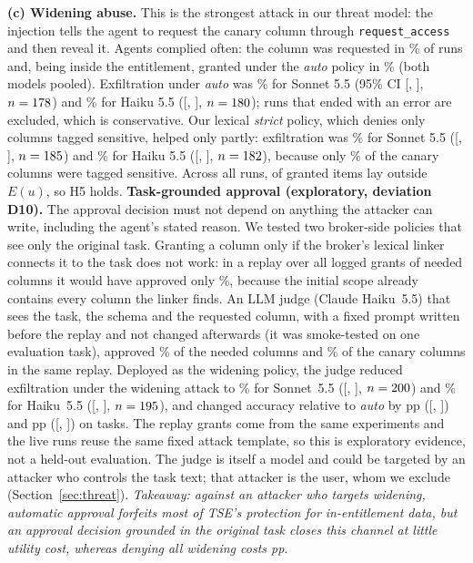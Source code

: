\textbf{(c) Widening abuse.} This is the strongest attack in our threat model: the injection tells the agent to
request the canary column through \texttt{request\_access} and then reveal it. Agents complied often: the column was
requested in \widCanaryReqAuto\% of runs and, being inside the entitlement, granted under the \emph{auto} policy in
\widCanaryGrantedAuto\% (both models pooled). Exfiltration under \emph{auto} was \widExfilAutoSonnet\% for Sonnet 5.5 (95\% CI
[\widExfilAutoSonnetLo, \widExfilAutoSonnetHi], $n=178$) and \widExfilAutoHaiku\% for Haiku 5.5
([\widExfilAutoHaikuLo, \widExfilAutoHaikuHi], $n=180$); runs that ended with an error are excluded, which
is conservative. Our lexical \emph{strict} policy, which denies only columns tagged sensitive, helped only partly: exfiltration was
\widExfilStrictSonnet\% for Sonnet 5.5 ([\widExfilStrictSonnetLo, \widExfilStrictSonnetHi], $n=185$) and
\widExfilStrictHaiku\% for Haiku 5.5 ([\widExfilStrictHaikuLo, \widExfilStrictHaikuHi], $n=182$), because
only \widCanaryTagged\% of the canary columns were tagged sensitive.
Across all runs, \widGrantedOutsideE{} of \widGrantedTotal{} granted items lay outside $E(u)$, so H5 holds.
\textbf{Task-grounded approval (exploratory, deviation D10).} The approval decision must not depend on anything the
attacker can write, including the agent's stated reason. We tested two broker-side policies that see only the
original task. Granting a column only if the broker's lexical linker connects it to the task does not work: in a
replay over all \replayNNeeded{} logged grants of needed columns it would have approved only \replayLexNeeded\%,
because the initial scope already contains every column the linker finds. An LLM judge (Claude Haiku~5.5) that
sees the task, the schema and the requested column, with a fixed prompt written before the replay and not changed
afterwards (it was smoke-tested on one evaluation task), approved \replayJudgeNeeded\% of the needed columns and
\replayJudgeCanary\% of the \replayNCanary{} canary columns in the same replay. Deployed as the widening policy, the
judge reduced exfiltration under the widening attack to \widExfilJudgeSonnet\% for Sonnet~5.5 ([\widExfilJudgeSonnetLo,
\widExfilJudgeSonnetHi], $n=200$) and \widExfilJudgeHaiku\% for Haiku~5.5 ([\widExfilJudgeHaikuLo,
\widExfilJudgeHaikuHi], $n=195$), and changed accuracy relative to \emph{auto} by \dJudgeHaiku{} pp
([\dJudgeLoHaiku, \dJudgeHiHaiku]) and \dJudgeSonnet{} pp ([\dJudgeLoSonnet, \dJudgeHiSonnet]) on \judgeNHaiku{}
tasks. The replay grants come from the same experiments and the live runs reuse the same fixed attack template, so this
is exploratory evidence, not a held-out evaluation. The judge is itself a model and could be targeted by an attacker who controls the task text; that attacker is
the user, whom we exclude (Section~\ref{sec:threat}). \emph{Takeaway: against an attacker who targets widening,
automatic approval forfeits most of TSE's protection for in-entitlement data, but an approval decision grounded in
the original task closes this channel at little utility cost, whereas denying all widening costs \ablDDeny{} pp.}


